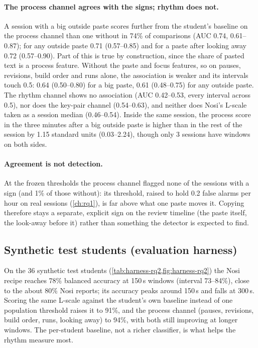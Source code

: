\paragraph{The process channel agrees with the signs; rhythm does not.} A session with a big
outside paste scores further from the student's baseline on the process channel than one
without in 74\% of comparisons (AUC 0.74, 0.61--0.87); for any outside paste 0.71
(0.57--0.85) and for a paste after looking away 0.72 (0.57--0.90). Part of this is true by
construction, since the share of pasted text is a process feature. Without the paste and
focus features, so on pauses, revisions, build order and runs alone, the association is
weaker and its intervals touch 0.5: 0.64 (0.50--0.80) for a big paste, 0.61 (0.48--0.75)
for any outside paste. The rhythm channel shows no association (AUC 0.42--0.53, every
interval across 0.5), nor does the key-pair channel (0.54--0.63), and neither does Nosi's
L-scale taken as a session median (0.46--0.54). Inside the same session, the process score
in the three minutes after a big outside paste is higher than in the rest of the session by
1.15 standard units (0.03--2.24), though only 3 sessions have windows on both sides.

\paragraph{Agreement is not detection.} At the frozen thresholds the process channel flagged
none of the sessions with a sign (and 1\% of those without): its threshold, raised to hold
0.2 false alarms per hour on real sessions (\cref{ch:rq1}), is far above what one paste moves
it. Copying therefore stays a separate, explicit sign on the review timeline (the paste
itself, the look-away before it) rather than something the detector is expected to find.



\subsection*{Synthetic test students (evaluation harness)}
On the 36 synthetic test students (\cref{tab:harness-rq2,fig:harness-rq2}) the
Nosi recipe reaches 78\% balanced accuracy at 150\,s windows (interval 73--84\%),
close to the about 80\% Nosi reports; its accuracy peaks around 150\,s and falls
at 300\,s. Scoring the same L-scale against the student's own baseline instead
of one population threshold raises it to 91\%, and the process channel (pauses,
revisions, build order, runs, looking away) to 94\%, with both still improving
at longer windows. The per-student baseline, not a richer classifier, is what
helps the rhythm measure most.

